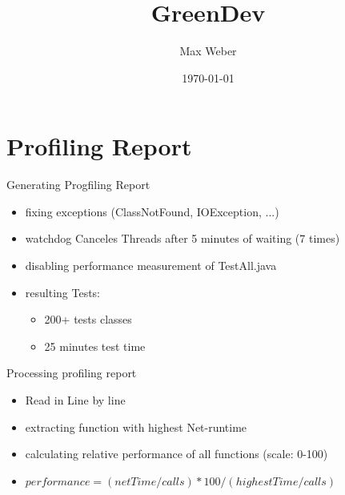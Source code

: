\documentclass[11pt,aspectratio=169]{beamer}
\title[Green Development]{GreenDev}
\author[M. Weber]{Max Weber}
\institute[Bauhaus-Universität Weimar]{}
\date[\today]{\today}
\begin{document}

\maketitle


\section{Profiling Report}

\begin{frame}{Generating Progfiling Report}
  \begin{itemize}
    \item fixing exceptions (ClassNotFound, IOException, ...)
    \item watchdog Canceles Threads after 5 minutes of waiting (7 times)
    \item disabling performance measurement of TestAll.java
    \item resulting Tests:
    \begin{itemize}
      \item 200+ tests classes
      \item 25 minutes test time
    \end{itemize}
  \end{itemize}
\end{frame}

\begin{frame}{Processing profiling report}
  \begin{itemize}
    \item Read in Line by line
    \item extracting function with highest Net-runtime
    \item calculating relative performance of all functions (scale: 0-100)
    \item $performance = (netTime/calls)*100/(highestTime/calls)$
  \end{itemize}
\end{frame}
\end{document}

